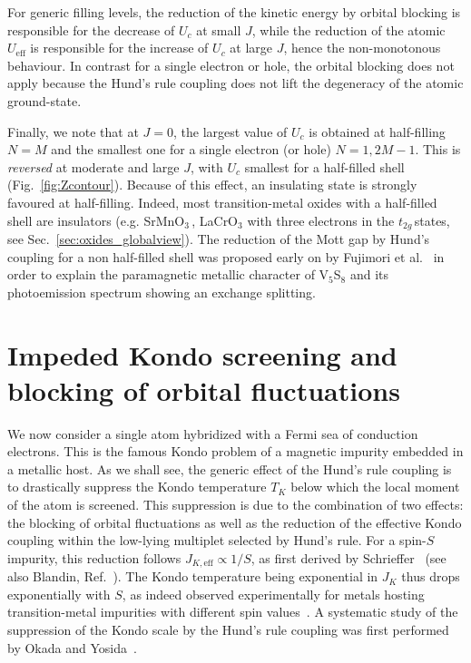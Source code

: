 \documentclass[]{ar2e-changed}%
\def\Ueff{U_{\mathrm{eff}}}
\def\ttg{$t_{2g}\,$}
\def\SMO{SrMnO$_3$\,}
\begin{document}
%
For generic filling levels, the reduction of the kinetic energy by orbital blocking is responsible 
for the decrease of $U_c$ at small $J$, while the reduction of the atomic $\Ueff$ is responsible for the 
increase of $U_c$ at large $J$, hence the non-monotonous behaviour. 
%
In contrast for a single electron or hole, the orbital blocking does not apply because the 
Hund's rule coupling does not lift the degeneracy of the atomic ground-state. 
%

Finally, we note that at $J=0$, the largest value of $U_c$ is obtained at half-filling $N=M$ and the smallest one for a single electron 
(or hole) $N=1,2M-1$.
%
This is {\it reversed} at moderate and large $J$, with $U_c$ smallest for a half-filled shell 
(Fig.~\ref{fig:Zcontour}). 
Because of this effect, an insulating state is strongly favoured at half-filling. Indeed, most 
transition-metal oxides with a half-filled shell are insulators 
(e.g. \SMO, LaCrO$_3$ with three electrons in the \ttg states, see Sec.~\ref{sec:oxides_globalview}). 
%
The reduction of the Mott gap by Hund's coupling for a non half-filled shell was proposed early on by 
Fujimori et al.~\cite{Fujimori_V5S8} in order to explain the paramagnetic metallic character of V$_5$S$_8$ 
and its photoemission spectrum showing an exchange splitting. 

\section{Impeded Kondo screening and blocking of orbital fluctuations}
\label{sec:kondo}

We now consider a single atom hybridized with a Fermi sea of conduction electrons.  
This is the famous Kondo problem of a magnetic impurity embedded in a metallic host.  
%
As we shall see, the generic effect of the Hund's rule coupling is to drastically suppress the Kondo 
temperature $T_K$ below which the local moment of the atom is screened. 
%
This suppression is due to the combination of two effects: the blocking of 
orbital fluctuations as well as the reduction of the effective Kondo coupling 
within the low-lying multiplet selected by Hund's rule.  
% 
For a spin-$S$ impurity, this reduction follows $J_{K,\mathrm{eff}}\propto 1/S$, 
as first derived by Schrieffer~\cite{schrieffer_japplphys_1967} (see also Blandin, Ref.~\cite{blandin_japplphys_1968}).  
%
The Kondo temperature being exponential in $J_K$ thus drops exponentially with $S$, as
indeed observed experimentally for metals hosting transition-metal impurities with  
different spin values~\cite{daybell_rmp_1968}.
%
A systematic study of the suppression of the Kondo scale by the Hund's rule 
coupling was first performed by Okada and Yosida~\cite{okada73}.
\end{document}
